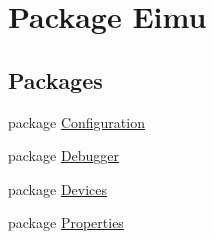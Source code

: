 \hypertarget{namespace_eimu}{
\section{Package Eimu}
\label{namespace_eimu}
}
\subsection*{Packages}
\begin{DoxyCompactItemize}
\item 
package \hyperlink{namespace_eimu_1_1_configuration}{Configuration}
\item 
package \hyperlink{namespace_eimu_1_1_debugger}{Debugger}
\item 
package \hyperlink{namespace_eimu_1_1_devices}{Devices}
\item 
package \hyperlink{namespace_eimu_1_1_properties}{Properties}
\end{DoxyCompactItemize}
